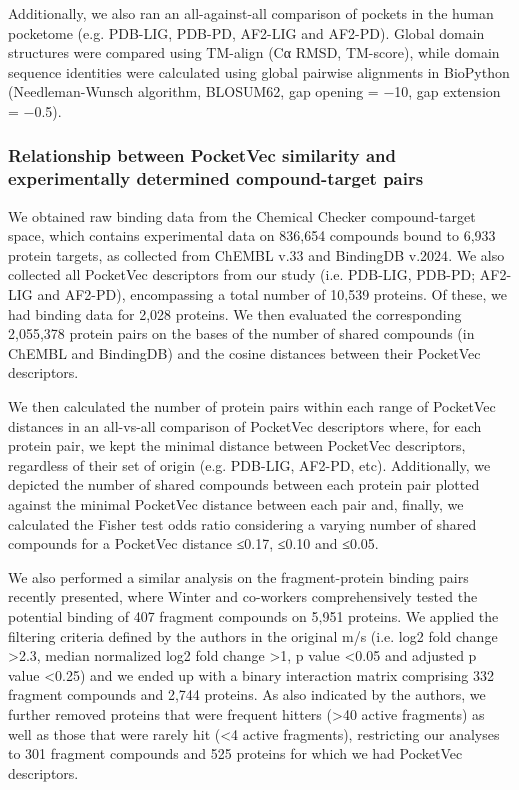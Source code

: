 Additionally, we also ran an all-against-all comparison of pockets in the human pocketome (e.g. PDB-LIG, PDB-PD, AF2-LIG and AF2-PD). Global domain structures were compared using TM-align\cite{zhang_tm-align_2005} (Cα RMSD, TM-score), while domain sequence identities were calculated using global pairwise alignments in BioPython\cite{cock_biopython_2009} (Needleman-Wunsch algorithm, BLOSUM62, gap opening = −10, gap extension = −0.5). 

\subsubsection{Relationship between PocketVec similarity and experimentally determined compound-target pairs}

We obtained raw binding data from the Chemical Checker compound-target space\cite{duran-frigola_extending_2020}, which contains experimental data on 836,654 compounds bound to 6,933 protein targets, as collected from ChEMBL v.33\cite{zdrazil_chembl_2024} and BindingDB v.2024\cite{gilson_bindingdb_2016}. We also collected all PocketVec descriptors from our study (i.e. PDB-LIG, PDB-PD; AF2-LIG and AF2-PD), encompassing a total number of 10,539 proteins. Of these, we had binding data for 2,028 proteins. We then evaluated the corresponding 2,055,378 protein pairs on the bases of the number of shared compounds (in ChEMBL and BindingDB) and the cosine distances between their PocketVec descriptors.

We then calculated the number of protein pairs within each range of PocketVec distances in an all-vs-all comparison of PocketVec descriptors where, for each protein pair, we kept the minimal distance between PocketVec descriptors, regardless of their set of origin (e.g. PDB-LIG, AF2-PD, etc). Additionally, we depicted the number of shared compounds between each protein pair plotted against the minimal PocketVec distance between each pair and, finally, we calculated the Fisher test odds ratio considering a varying number of shared compounds for a PocketVec distance ≤0.17, ≤0.10 and ≤0.05.

We also performed a similar analysis on the fragment-protein binding pairs recently presented\cite{offensperger_large-scale_2024}, where Winter and co-workers comprehensively tested the potential binding of 407 fragment compounds on 5,951 proteins. We applied the filtering criteria defined by the authors in the original m/s (i.e. log2 fold change >2.3, median normalized log2 fold change >1, p value <0.05 and adjusted p value <0.25) and we ended up with a binary interaction matrix comprising 332 fragment compounds and 2,744 proteins. As also indicated by the authors, we further removed proteins that were frequent hitters (>40 active fragments) as well as those that were rarely hit (<4 active fragments), restricting our analyses to 301 fragment compounds and 525 proteins for which we had PocketVec descriptors. 


